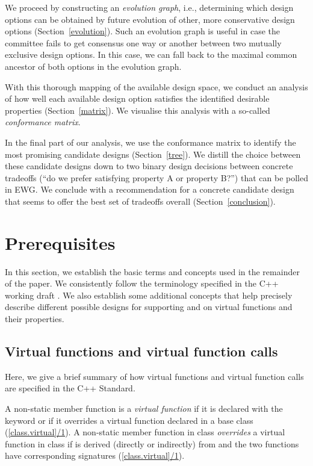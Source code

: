 We proceed by constructing an \emph{evolution graph}, i.e., determining which design options can be obtained by future evolution of other, more conservative design options (Section~\ref{evolution}). Such an evolution graph is useful in case the committee fails to get consensus one way or another between two mutually exclusive design options. In this case, we can fall back to the maximal common ancestor of both options in the evolution graph.

With this thorough mapping of the available design space, we conduct an analysis of how well each available design option satisfies the identified desirable properties (Section~\ref{matrix}). We visualise this analysis with a so-called \emph{conformance matrix}. 

In the final part of our analysis, we use the conformance matrix to identify the most promising candidate designs (Section~\ref{tree}). We distill the choice between these candidate designs down to two binary design decisions between concrete tradeoffs (``do we prefer satisfying property A or property B?'') that can be polled in EWG. We conclude with a recommendation for a concrete candidate design that seems to offer the best set of tradeoffs overall (Section~\ref{conclusion}).

\section{Prerequisites}
\label{prerequisites}


In this section, we establish the basic terms and concepts used in the remainder of the paper. We consistently follow the terminology specified in the C++ working draft \cite{N5014}. We also establish some additional concepts that help precisely describe different possible designs for supporting  and  on virtual functions and their properties.

\subsection{Virtual functions and virtual function calls}

Here, we give a brief summary of how virtual functions and virtual function calls are specified in the C++ Standard.

A non-static member function is a \emph{virtual function} if it is declared with the keyword  or if it overrides a virtual function declared in a base class (\href{https://eel.is/c++draft/class.virtual#1}{[class.virtual]/1}). A non-static member function  in class  \emph{overrides} a virtual function  in class  if  is derived (directly or indirectly) from  and the two functions have corresponding signatures (\href{https://eel.is/c++draft/class.virtual#2.sentence-1}{[class.virtual]/1}).

